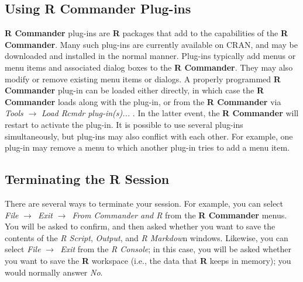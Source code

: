 \documentclass{article}%
\begin{document}
\subsection{Using R Commander Plug-ins\label{sec-plugins}}

\textbf{R Commander} plug-ins are \textbf{R} packages that add to the
capabilities of the \textbf{R Commander}. Many such plug-ins are currently
available on CRAN, and may be downloaded and installed in the normal manner.
Plug-ins typically add menus or menu items and associated dialog boxes to the
\textbf{R Commander}. They may also modify or remove existing menu items or
dialogs. A properly programmed \textbf{R Commander} plug-in can be loaded
either directly, in which case the \textbf{R Commander }loads along with the
plug-in, or from the \textbf{R Commander} via \emph{Tools} $\longrightarrow$
\emph{Load Rcmdr plug-in(s)...} . In the latter event, the \textbf{R
Commander} will restart to activate the plug-in. It is possible to use several
plug-ins simultaneously, but plug-ins may also conflict with each other. For
example, one plug-in may remove a menu to which another plug-in tries to add a
menu item.

\subsection{Terminating the R Session}

There are several ways to terminate your session. For example, you can select
\emph{File }$\longrightarrow$\emph{\ Exit }$\longrightarrow$\emph{\ From
Commander and R} from the \textbf{R Commander }menus. You will be asked to
confirm, and then asked whether you want to save the contents of the \emph{R
Script}, \emph{Output}, and \emph{R Markdow}n windows. Likewise, you can
select \emph{File }$\longrightarrow$\emph{\ Exit} from the \emph{R Console};
in this case, you will be asked whether you want to save the \textbf{R}
workspace (i.e., the data that \textbf{R} keeps in memory); you would normally
answer \emph{No}.

%

\end{document}
